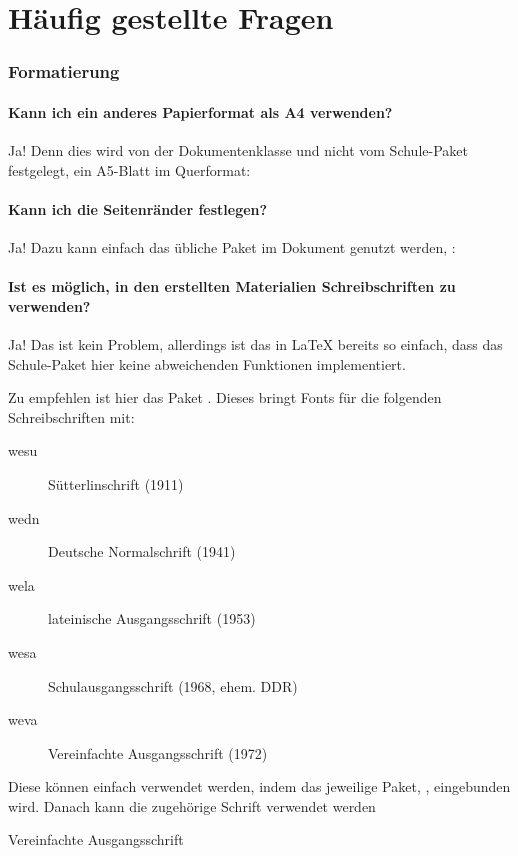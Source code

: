\part{Häufig gestellte Fragen}
	\section{Formatierung}
		\subsection{Kann ich ein anderes Papierformat als A4 verwenden?}
			Ja! Denn dies wird von der Dokumentenklasse und nicht vom
			Schule-Paket festgelegt, \zB\space ein A5-Blatt im Querformat:
		\subsection{Kann ich die Seitenränder festlegen?}
			Ja! Dazu kann einfach das übliche Paket  im
			Dokument genutzt werden, \zB:
\begin{sourcecode}
  \usepackage[
    left=3cm,
    right=2cm,
    top=2cm,
    bottom=2cm,
    footskip=1cm
  ]{geometry}
\end{sourcecode}
		\subsection{Ist es möglich, in den erstellten Materialien
		 Schreibschriften zu verwenden?}
			Ja! Das ist kein Problem, allerdings ist das in \LaTeX\space
			bereits so einfach, dass das Schule-Paket hier keine
			abweichenden Funktionen implementiert.
			
			Zu empfehlen ist hier das Paket .
			Dieses bringt Fonts für die folgenden Schreibschriften mit:
			
			\begin{description}
				\item[wesu] Sütterlinschrift (1911)
				\item[wedn] Deutsche Normalschrift (1941)
				\item[wela] lateinische Ausgangsschrift (1953) 
				\item[wesa] Schulausgangsschrift (1968, ehem. DDR)
				\item[weva] Vereinfachte Ausgangsschrift (1972)
			\end{description}
			
			Diese können einfach verwendet werden, indem das jeweilige
			Paket, \zB\space{}, eingebunden wird. Danach kann
			die zugehörige Schrift verwendet werden
			
\begin{example}
  \weva Vereinfachte Ausgangsschrift
\end{example}